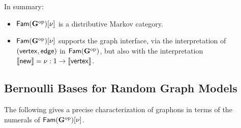 In summary:
  \begin{itemize}\item $\mathsf{Fam}(\mathbf{G}^\mathrm{op})[\nu]$ is a distributive Markov category.
  \item $\mathsf{Fam}(\mathbf{G}^\mathrm{op})[\nu]$ supports the graph interface, via
    the interpretation of $(\mathsf{vertex},\mathsf{edge})$ in $\mathsf{Fam}(\mathbf{G}^\mathrm{op})$, but also with the 
    interpretation
    $\llbracket \mathsf{new}\rrbracket=\nu:1\to \llbracket \mathsf{vertex}\rrbracket$.
  \end{itemize}


\subsection{Bernoulli Bases for Random Graph Models}
\label{sec:bernoulli-base-graphon}
The following gives a precise characterization of graphons in terms of the numerals of $\mathsf{Fam}(\mathbf{G}^\mathrm{op})[\nu]$.

